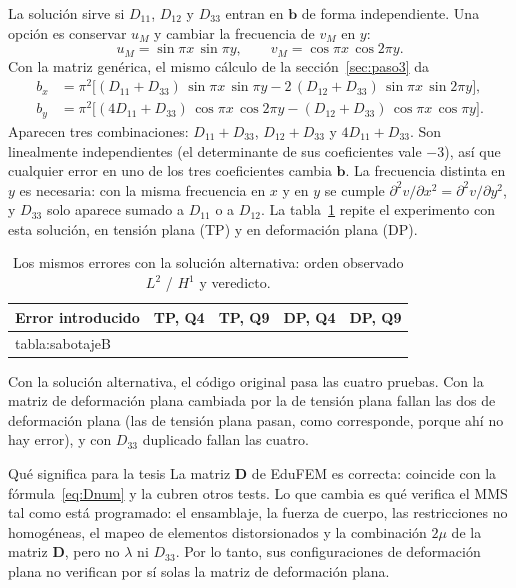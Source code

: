 \documentclass[11pt,a4paper]{article}
\newcommand{\tabla}[1]{\csname tabla:#1\endcsname}
\begin{document}
La solución sirve si $D_{11}$, $D_{12}$ y $D_{33}$ entran en $\bm b$ de forma independiente. Una
opción es conservar $u_M$ y cambiar la frecuencia de $v_M$ en $y$:
\[
  u_M = \sin\pi x\,\sin\pi y, \qquad v_M = \cos\pi x\,\cos 2\pi y .
\]
Con la matriz genérica, el mismo cálculo de la sección~\ref{sec:paso3} da
\begin{equation}\label{eq:balternativa}
\begin{aligned}
  b_x &= \pi^2\bigl[(D_{11}+D_{33})\,\sin\pi x\,\sin\pi y - 2\,(D_{12}+D_{33})\,\sin\pi x\,\sin 2\pi y\bigr],\\
  b_y &= \pi^2\bigl[(4D_{11}+D_{33})\,\cos\pi x\,\cos 2\pi y - (D_{12}+D_{33})\,\cos\pi x\,\cos\pi y\bigr].
\end{aligned}
\end{equation}
Aparecen tres combinaciones: $D_{11}+D_{33}$, $D_{12}+D_{33}$ y $4D_{11}+D_{33}$. Son linealmente
independientes (el determinante de sus coeficientes vale $-3$), así que cualquier error en uno de
los tres coeficientes cambia $\bm b$. La frecuencia distinta en $y$ es necesaria: con la misma
frecuencia en $x$ y en $y$ se cumple $\partial^2 v/\partial x^2 = \partial^2 v/\partial y^2$, y
$D_{33}$ solo aparece sumado a $D_{11}$ o a $D_{12}$. La tabla~\ref{tab:sabotajeB} repite el
experimento con esta solución, en tensión plana (TP) y en deformación plana (DP).

\begin{table}[H]
\centering\small
\caption{Los mismos errores con la solución alternativa: orden observado $L^2$ / $H^1$ y veredicto.}\label{tab:sabotajeB}
\setlength{\tabcolsep}{4.5pt}
\begin{tabular}{@{}lcccc@{}}
\toprule
Error introducido & TP, Q4 & TP, Q9 & DP, Q4 & DP, Q9\\
\midrule
\tabla{sabotajeB}
\bottomrule
\end{tabular}
\end{table}

Con la solución alternativa, el código original pasa las cuatro pruebas. Con la matriz de
deformación plana cambiada por la de tensión plana fallan las dos de deformación plana (las de
tensión plana pasan, como corresponde, porque ahí no hay error), y con $D_{33}$ duplicado fallan
las cuatro.

\begin{aviso}{Qué significa para la tesis}
La matriz $\bm D$ de EduFEM es correcta: coincide con la fórmula~\eqref{eq:Dnum} y la
cubren otros tests. Lo que cambia es qué verifica el MMS tal como está programado: el ensamblaje,
la fuerza de cuerpo, las restricciones no homogéneas, el mapeo de elementos distorsionados y la
combinación $2\mu$ de la matriz $\bm D$, pero no $\lambda$ ni $D_{33}$. Por lo tanto, sus
configuraciones de deformación plana no verifican por sí solas la matriz de deformación plana.
\end{aviso}
\end{document}
